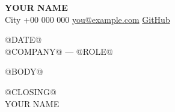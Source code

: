 \documentclass[11pt]{article}
\begin{document}
{\fontsize{20}{20}\selectfont\textbf{YOUR NAME}}\\[4pt]
{\small City \textperiodcentered{} +00 000 000 \textperiodcentered{}
\href{mailto:you@example.com}{you@example.com} \textperiodcentered{}
\href{https://github.com/your-handle}{GitHub}}

\vspace{10pt}
@DATE@ \\
@COMPANY@ — @ROLE@

@BODY@

@CLOSING@\\
YOUR NAME
\end{document}
